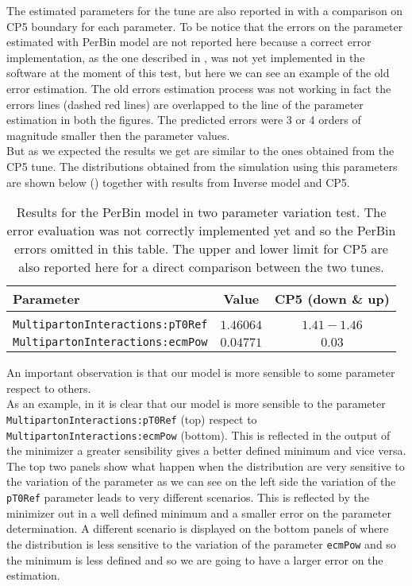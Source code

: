 \noindent The estimated parameters for the tune are also reported in  with a comparison on CP5 boundary for each parameter. To be notice that the errors on the parameter estimated with PerBin model are not reported here because a correct error implementation, as the one described in , was not yet implemented in the software at the moment of this test, but here we can see an example of the old error estimation. The old errors estimation process was not working in fact the errors lines (dashed red lines) are overlapped to the line of the parameter estimation in both the figures. The predicted errors were 3 or 4 orders of magnitude smaller then the parameter values. 
\\
But as we expected the results we get are similar to the ones obtained from the CP5 tune. The distributions obtained from the simulation using this parameters are shown below () together with results from Inverse model and CP5.

\begin{table}[!htb]
\centering
	\begin{tabular}{l | c | c}
		Parameter & Value & CP5 (down \& up) \\ \hline\hline
		\\[-0.85em]		
		\texttt{MultipartonInteractions:pT0Ref} & $ 1.46064$ & $1.41-1.46$\\
		\texttt{MultipartonInteractions:ecmPow} & $ 0.04771$ & $0.03$\\
	\end{tabular}
	\caption{Results for the PerBin model in two parameter variation test. The error evaluation was not correctly implemented yet and so the PerBin errors omitted in this table. The upper and lower limit for CP5 are also reported here for a direct comparison between the two tunes.}
	\label{table:resultPerBin_2param}
\end{table}

\medskip

An important observation is that our model is more sensible to some parameter respect to others.
\\
As an example, in  it is clear that our model is more sensible to the parameter \texttt{MultipartonInteractions:pT0Ref} (top) respect to 
\\
\texttt{MultipartonInteractions:ecmPow} (bottom). This is reflected in the output of the minimizer a greater sensibility gives a better defined minimum and vice versa. The top two panels show what happen when the distribution are very sensitive to the variation of the parameter as we can see on the left side the variation of the \texttt{pT0Ref} parameter leads to very different scenarios. This is reflected by the minimizer out in a well defined minimum and a smaller error on the parameter determination. A different scenario is displayed on the bottom panels of  where the distribution is less sensitive to the variation of the parameter \texttt{ecmPow} and so the minimum is less defined and so we are going to have a larger error on the estimation.

